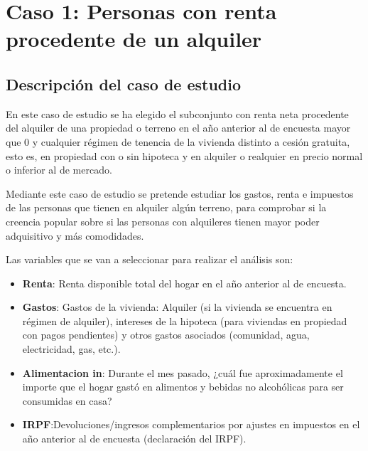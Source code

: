 
\chapter{Caso 1: Personas con renta procedente de un alquiler}

\section{Descripción del caso de estudio}
En este caso de estudio se ha elegido el subconjunto con renta neta procedente del alquiler de una
propiedad o terreno en el año anterior al de encuesta mayor que 0 y cualquier régimen de tenencia de la vivienda distinto a cesión gratuita, esto es, en propiedad con o sin hipoteca y en alquiler o realquier en precio normal o inferior al de mercado.

Mediante este caso de estudio se pretende estudiar los gastos, renta e impuestos de las personas que tienen en alquiler algún terreno, para comprobar si la creencia popular sobre si las personas con alquileres tienen mayor poder adquisitivo y más comodidades.

Las variables que se van a seleccionar para realizar el análisis son:
\begin{itemize}
\item \textbf{Renta}: Renta disponible total del hogar en el año anterior al de encuesta.
\item \textbf{Gastos}: Gastos de la vivienda: Alquiler (si la vivienda se encuentra en régimen de alquiler), intereses de la hipoteca (para viviendas en propiedad con pagos pendientes) y otros gastos asociados (comunidad, agua, electricidad, gas, etc.).
\item \textbf{Alimentacion in}: Durante el mes pasado, ¿cuál fue aproximadamente el importe que el hogar gastó en alimentos y bebidas no alcohólicas para ser consumidas en casa?
\item \textbf{IRPF}:Devoluciones/ingresos complementarios por ajustes en impuestos en el año anterior al de encuesta (declaración del IRPF).
\end{itemize}

